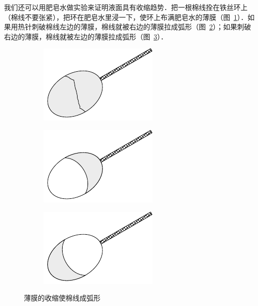 我们还可以用肥皂水做实验来证明液面具有收缩趋势．把一根棉线拴在铁丝环上（棉线不要张紧），把环在肥皂水里浸一下，使环上布满肥皂水的薄膜（图~\ref{fig_B_4-9a}）．如果用热针刺破棉线左边的薄膜，棉线就被右边的薄膜拉成弧形（图~\ref{fig_B_4-9b}）；如果刺破右边的薄膜，棉线就被左边的薄膜拉成弧形（图~\ref{fig_B_4-9c}）．
\begin{figure}[htbp]
    \centering
    \begin{subfigure}{0.3\linewidth}
        \centering
        \includegraphics{fig/B/4-9a.pdf}
        \caption{}\label{fig_B_4-9a}
    \end{subfigure}
    \hfil
    \begin{subfigure}{0.3\linewidth}
        \centering
        \includegraphics{fig/B/4-9b.pdf}
        \caption{}\label{fig_B_4-9b}
    \end{subfigure}
    \hfil
    \begin{subfigure}{0.3\linewidth}
        \centering
        \includegraphics{fig/B/4-9c.pdf}
        \caption{}\label{fig_B_4-9c}
    \end{subfigure}
    \caption{薄膜的收缩使棉线成弧形}\label{fig_B_4-9}
\end{figure}

